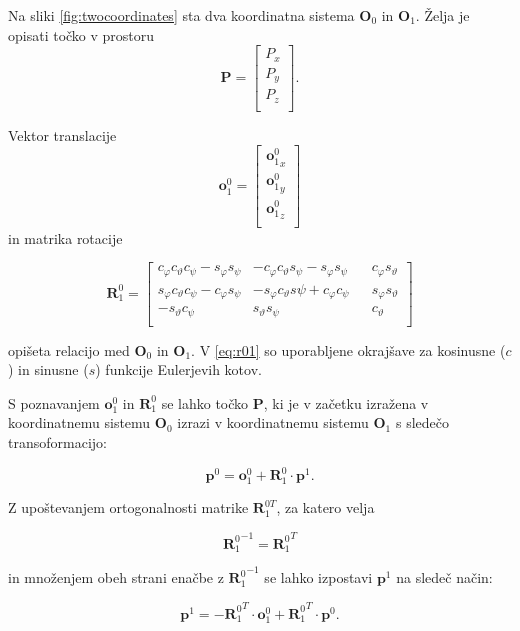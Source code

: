 
Na sliki \ref{fig:twocoordinates} sta dva koordinatna sistema $\textbf{O}_0$ in $\textbf{O}_1$. Želja je opisati točko v prostoru 
\begin{equation} \label{eq:p-point}
	\textbf{P} = 
	\begin{bmatrix}
		P_x \\
		P_y \\
		P_z \\
	\end{bmatrix}.
\end{equation}

Vektor translacije
\begin{equation} \label{eq:o0-to-01}
\textbf{o}_1^0 = 
\begin{bmatrix}
{\textbf{o}_1^0}_x \\
{\textbf{o}_1^0}_y \\
{\textbf{o}_1^0}_z \\
\end{bmatrix} 
\end{equation} 
in matrika rotacije

\begin{equation} \label{eq:r01}
\textbf{R}_1^0 = 
\begin{bmatrix}
c_\varphi c_\vartheta c_\psi - s_\varphi s_\psi & - c_\varphi c_\vartheta s_\psi - s_\varphi s_\psi && c_\varphi s_\vartheta \\
s_\varphi c_\vartheta c_\psi - c_\varphi s_\psi & - s_\varphi c_\vartheta s\psi + c_\varphi c_\psi && s_\varphi s_\vartheta \\
- s_\vartheta c_\psi & s_\vartheta s_\psi && c_\vartheta \\
\end{bmatrix}
\end{equation} 

opišeta relacijo med $\textbf{O}_0$ in $\textbf{O}_1$. V \ref{eq:r01} so uporabljene okrajšave za kosinusne ($c$) in sinusne ($s$) funkcije Eulerjevih kotov.

S poznavanjem $\textbf{o}_1^0$ in $\textbf{R}_1^0$ se lahko točko $\textbf{P}$, ki je v začetku izražena v koordinatnemu sistemu $\textbf{O}_0$ izrazi v koordinatnemu sistemu $\textbf{O}_1$ s sledečo transoformacijo:

\begin{equation} \label{eq:basic-transofrm}
\textbf{p}^0 = \textbf{o}_1^0 + \textbf{R}_1^0 \cdot \textbf{p}^1.
\end{equation}

Z upoštevanjem ortogonalnosti matrike  $\textbf{R}_1^{0T}$, za katero velja

\begin{equation} \label{eq:r-matrix}
{\textbf{R}_1^{0}}^{-1} = {\textbf{R}_1^{0}}^{T}
\end{equation}

in množenjem obeh strani enačbe z ${\textbf{R}_1^{0}}^{-1}$ se lahko izpostavi $\textbf{p}^1$ na sledeč način:

\begin{equation} \label{eq:basic-inverse-transofrm}
\textbf{p}^1 = - {\textbf{R}_1^{0}}^{T} \cdot \textbf{o}_1^0 + {\textbf{R}_1^{0}}^{T} \cdot \textbf{p}^0.
\end{equation}